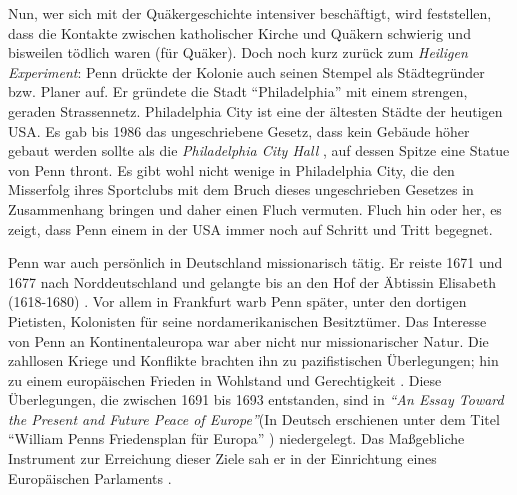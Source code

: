\medskip

Nun, wer sich mit der Quäkergeschichte intensiver beschäftigt, wird feststellen,
dass die Kontakte zwischen katholischer Kirche und Quäkern schwierig und
bisweilen tödlich waren (für Quäker). Doch noch kurz zurück zum \textit{Heiligen
Experiment}: Penn drückte der Kolonie auch seinen Stempel als Städtegründer
bzw. Planer auf. Er gründete die Stadt "`Philadelphia"' mit einem strengen, geraden
Strassennetz. Philadelphia City ist eine der ältesten Städte der heutigen USA. Es gab
bis 1986 das ungeschriebene Gesetz, dass kein Gebäude höher gebaut werden sollte
als die \textit{Philadelphia City Hall} ,
auf dessen Spitze eine Statue von Penn thront. Es gibt wohl nicht wenige in
Philadelphia City, die den Misserfolg ihres Sportclubs
mit dem Bruch dieses ungeschrieben Gesetzes in Zusammenhang bringen und daher einen Fluch vermuten.
Fluch hin oder her, es zeigt, dass Penn einem in der USA immer noch auf
Schritt und Tritt
begegnet.

\medskip

Penn war auch persönlich in Deutschland missionarisch tätig. Er reiste 1671 und 1677
nach Norddeutschland  und gelangte bis an den Hof
der Äbtissin Elisabeth (1618-1680) . Vor
allem in Frankfurt  warb Penn später, unter den dortigen
Pietisten,
Kolonisten  für seine nordamerikanischen
 Besitztümer. Das Interesse von Penn an Kontinentaleuropa war
aber nicht nur missionarischer Natur. Die zahllosen Kriege und Konflikte brachten
ihn zu pazifistischen 
Überlegungen; hin zu einem europäischen Frieden  in
Wohlstand  und Gerechtigkeit . Diese Überlegungen, die 
zwischen 1691 bis 1693 entstanden, sind in \textit{"`An Essay Toward the Present and Future
Peace of Europe"'}(In Deutsch erschienen unter dem Titel "`William Penns
Friedensplan für Europa"' ) niedergelegt. Das Maßgebliche Instrument zur
Erreichung dieser Ziele sah er in der Einrichtung eines Europäischen Parlaments
.


